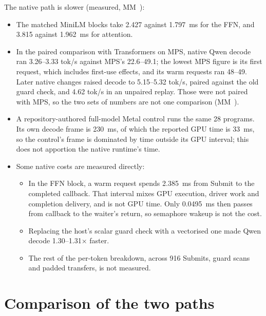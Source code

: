 The native path is slower (measured, MM~):

\begin{itemize}
\item The matched MiniLM blocks take 2.427 against 1.797~ms for the FFN, and 3.815 against 1.962~ms for attention.
\item In the paired comparison with Transformers on MPS, native Qwen decode ran 3.26–3.33 tok/s against MPS's 22.6–49.1;
  the lowest MPS figure is its first request, which includes first-use effects, and its warm requests ran 48–49.
  Later native changes raised decode to 5.15–5.32 tok/s, paired against the old guard check, and 4.62 tok/s in an
  unpaired replay. Those were not paired with MPS, so the two sets of numbers are not one comparison
  (MM~).
\item A repository-authored full-model Metal control runs the same 28 programs. Its own decode frame is 230~ms, of which
  the reported GPU time is 33~ms, so the control's frame is dominated by time outside its GPU interval; this does
  not apportion the native runtime's time.
\item Some native costs are measured directly:

  \begin{itemize}
  \item In the FFN block, a warm request spends 2.385~ms from Submit to the completed callback. That interval mixes GPU
  execution, driver work and completion delivery, and is not GPU time. Only 0.0495~ms then passes from callback to
  the waiter's return, so semaphore wakeup is not the cost.
  \item Replacing the host's scalar guard check with a vectorised one made Qwen decode 1.30–1.31× faster.
  \item The rest of the per-token breakdown, across 916 Submits, guard scans and padded transfers, is not measured.
  \end{itemize}
\end{itemize}

\section{Comparison of the two paths}\label{ch:comparing-two-paths}

